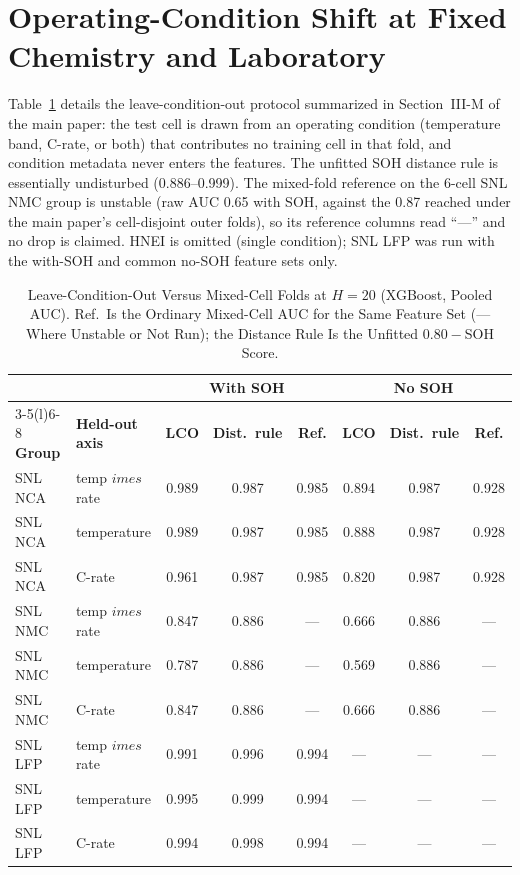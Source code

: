 \documentclass[journal]{IEEEtran}
\begin{document}
\section{Operating-Condition Shift at Fixed Chemistry and Laboratory}
Table~\ref{tab:s_cond} details the leave-condition-out protocol summarized in Section~III-M of the main paper: the test cell is drawn from an operating condition (temperature band, C-rate, or both) that contributes no training cell in that fold, and condition metadata never enters the features. The unfitted SOH distance rule is essentially undisturbed (0.886--0.999). The mixed-fold reference on the 6-cell SNL NMC group is unstable (raw AUC 0.65 with SOH, against the 0.87 reached under the main paper's cell-disjoint outer folds), so its reference columns read ``---'' and no drop is claimed. HNEI is omitted (single condition); SNL LFP was run with the with-SOH and common no-SOH feature sets only.
\begin{table}[!t]
\caption{Leave-Condition-Out Versus Mixed-Cell Folds at $H{=}20$ (XGBoost, Pooled AUC). Ref.\ Is the Ordinary Mixed-Cell AUC for the Same Feature Set (--- Where Unstable or Not Run); the Distance Rule Is the Unfitted $0.80-$SOH Score.}
\label{tab:s_cond}
\centering\footnotesize\setlength{\tabcolsep}{4pt}
\begin{tabular}{llcccccc}
\toprule
 & & \multicolumn{3}{c}{\textbf{With SOH}} & \multicolumn{3}{c}{\textbf{No SOH}}\\
\cmidrule(lr){3-5}\cmidrule(l){6-8}
\textbf{Group} & \textbf{Held-out axis} & \textbf{LCO} & \textbf{Dist.\ rule} & \textbf{Ref.} & \textbf{LCO} & \textbf{Dist.\ rule} & \textbf{Ref.}\\
\midrule
SNL NCA & temp $	imes$ rate & 0.989 & 0.987 & 0.985 & 0.894 & 0.987 & 0.928\\
SNL NCA & temperature & 0.989 & 0.987 & 0.985 & 0.888 & 0.987 & 0.928\\
SNL NCA & C-rate & 0.961 & 0.987 & 0.985 & 0.820 & 0.987 & 0.928\\
SNL NMC & temp $	imes$ rate & 0.847 & 0.886 & --- & 0.666 & 0.886 & ---\\
SNL NMC & temperature & 0.787 & 0.886 & --- & 0.569 & 0.886 & ---\\
SNL NMC & C-rate & 0.847 & 0.886 & --- & 0.666 & 0.886 & ---\\
SNL LFP & temp $	imes$ rate & 0.991 & 0.996 & 0.994 & --- & --- & ---\\
SNL LFP & temperature & 0.995 & 0.999 & 0.994 & --- & --- & ---\\
SNL LFP & C-rate & 0.994 & 0.998 & 0.994 & --- & --- & ---\\
\bottomrule
\end{tabular}
\end{table}
\end{document}
